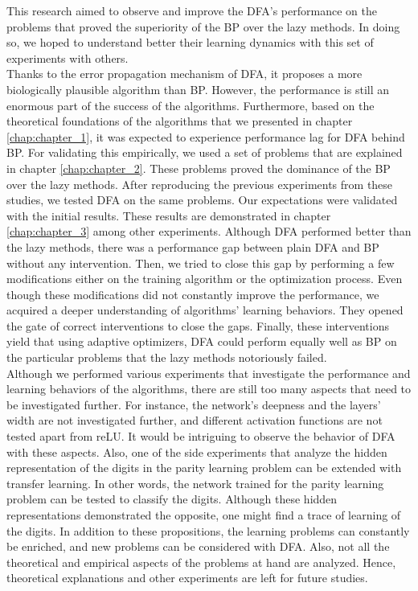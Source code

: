 \documentclass[a4paper, nobind]{templates/ociamthesis}
\begin{document}
This research aimed to observe and improve the DFA's performance on the problems that proved the superiority of the BP over the lazy methods. In doing so, we hoped to understand better their learning dynamics with this set of experiments with others.\\
Thanks to the error propagation mechanism of DFA, it proposes a more biologically plausible algorithm than BP. However, the performance is still an enormous part of the success of the algorithms. Furthermore, based on the theoretical foundations of the algorithms that we presented in chapter \ref{chap:chapter_1}, it was expected to experience performance lag for DFA behind BP. For validating this empirically, we used a set of problems that are explained in chapter \ref{chap:chapter_2}. These problems proved the dominance of the BP over the lazy methods. After reproducing the previous experiments from these studies, we tested DFA on the same problems. Our expectations were validated with the initial results. These results are demonstrated in chapter \ref{chap:chapter_3} among other experiments. Although DFA performed better than the lazy methods, there was a performance gap between plain DFA and BP without any intervention. Then, we tried to close this gap by performing a few modifications either on the training algorithm or the optimization process. Even though these modifications did not constantly improve the performance, we acquired a deeper understanding of algorithms' learning behaviors. They opened the gate of correct interventions to close the gaps. Finally, these interventions yield that using adaptive optimizers, DFA could perform equally well as BP on the particular problems that the lazy methods notoriously failed.\\
Although we performed various experiments that investigate the performance and learning behaviors of the algorithms, there are still too many aspects that need to be investigated further. For instance, the network's deepness and the layers' width are not investigated further, and different activation functions are not tested apart from reLU. It would be intriguing to observe the behavior of DFA with these aspects. Also, one of the side experiments that analyze the hidden representation of the digits in the parity learning problem can be extended with transfer learning. In other words, the network trained for the parity learning problem can be tested to classify the digits. Although these hidden representations demonstrated the opposite, one might find a trace of learning of the digits. In addition to these propositions, the learning problems can constantly be enriched, and new problems can be considered with DFA. Also, not all the theoretical and empirical aspects of the problems at hand are analyzed. Hence, theoretical explanations and other experiments are left for future studies.\\
\end{document}
